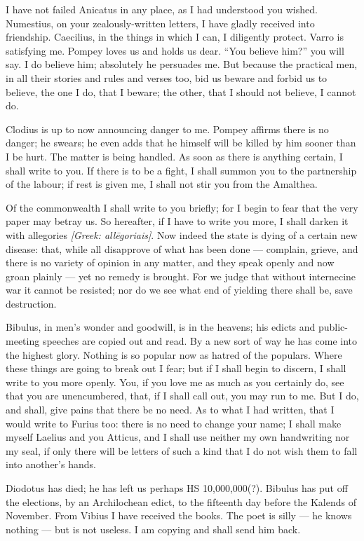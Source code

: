 

 I have not failed Anicatus in any place, as I had understood you wished. Numestius, on your zealously-written letters, I have gladly received into friendship. Caecilius, in the things in which I can, I diligently protect. Varro is satisfying me. Pompey loves us and holds us dear. ``You believe him?'' you will say. I do believe him; absolutely he persuades me. But because the practical men, in all their stories and rules and verses too, bid us beware and forbid us to believe, the one I do, that I beware; the other, that I should not believe, I cannot do.

 Clodius is up to now announcing danger to me. Pompey affirms there is no danger; he swears; he even adds that he himself will be killed by him sooner than I be hurt. The matter is being handled. As soon as there is anything certain, I shall write to you. If there is to be a fight, I shall summon you to the partnership of the labour; if rest is given me, I shall not stir you from the Amalthea.

 Of the commonwealth I shall write to you briefly; for I begin to fear that the very paper may betray us. So hereafter, if I have to write you more, I shall darken it with allegories \textit{[Greek: all\=egoriais]}. Now indeed the state is dying of a certain new disease: that, while all disapprove of what has been done --- complain, grieve, and there is no variety of opinion in any matter, and they speak openly and now groan plainly --- yet no remedy is brought. For we judge that without internecine war it cannot be resisted; nor do we see what end of yielding there shall be, save destruction.

 Bibulus, in men's wonder and goodwill, is in the heavens; his edicts and public-meeting speeches are copied out and read. By a new sort of way he has come into the highest glory. Nothing is so popular now as hatred of the populars. Where these things are going to break out I fear; but if I shall begin to discern, I shall write to you more openly. You, if you love me as much as you certainly do, see that you are unencumbered, that, if I shall call out, you may run to me. But I do, and shall, give pains that there be no need. As to what I had written, that I would write to Furius too: there is no need to change your name; I shall make myself Laelius and you Atticus, and I shall use neither my own handwriting nor my seal, if only there will be letters of such a kind that I do not wish them to fall into another's hands.

 Diodotus has died; he has left us perhaps HS 10,000,000(?). Bibulus has put off the elections, by an Archilochean edict, to the fifteenth day before the Kalends of November. From Vibius I have received the books. The poet is silly --- he knows nothing --- but is not useless. I am copying and shall send him back.
